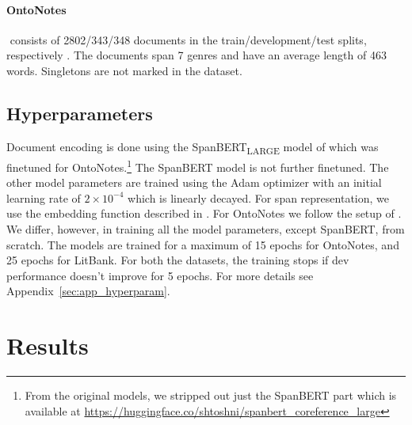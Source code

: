 \documentclass[11pt,a4paper]{article}
\begin{document}
\paragraph{OntoNotes} $\!\!\!\!$ consists of 2802/343/348 documents in the train/development/test splits, respectively \cite{pradhan2012conll}.
The documents span 7 genres and have an average length of 463 words.
Singletons are not marked in the dataset.



\subsection{Hyperparameters}
\label{sec:hyperparam}

Document encoding is done using the SpanBERT\textsubscript{LARGE} model of \citet{joshi2020span} which was finetuned for OntoNotes.\footnote{
From the original models, we stripped out just the SpanBERT part which is available at \url{https://huggingface.co/shtoshni/spanbert_coreference_large}
}  The SpanBERT model is not further finetuned.
The other model parameters are trained using the Adam optimizer \citep{kingma2014adam} with an initial learning rate of $2 \times 10^{-4}$ which is linearly decayed.
For span representation, we use the embedding function described in \citet{lee-etal-2017-end}.
For OntoNotes we follow the setup of \citet{xia2020revisiting}. We differ, however, in training all the model parameters, except SpanBERT, from scratch.
The models are trained for a maximum of 15 epochs for OntoNotes, and 25 epochs for LitBank. For both the datasets, the training stops if dev performance doesn't improve for 5 epochs. For more details see Appendix~\ref{sec:app_hyperparam}.
 \section{Results}
\end{document}
